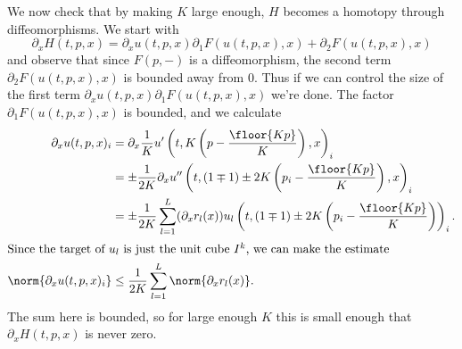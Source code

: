 We now check that by making $K$ large enough, $H$ becomes a homotopy through diffeomorphisms. We start with
$$\partial_x H(t,p,x) = \partial_x u(t,p,x) \partial_1 F(u(t,p,x), x) + \partial_2 F(u(t,p,x), x)$$
and observe that since $F(p, -)$ is a diffeomorphism, the second term $\partial_2 F(u(t,p,x), x)$ is bounded away from $0$. Thus if we can control the
size of the first term $\partial_x u(t,p,x) \partial_1 F(u(t,p,x), x)$ we're done. The factor $\partial_1 F(u(t,p,x), x)$ is bounded, and we
calculate 
\begin{align*}
\partial_x u(t,p,x)_i & = \partial_x \frac{1}{K} u'\left(t, K\left(p - \frac{\floor{K p}}{K}\right), x\right)_i \\
                      & = \pm \frac{1}{2 K} \partial_x u''\left(t, (1\mp1)\pm 2K\left(p_i-\frac{\floor{K p}}{K}\right), x\right)_i \\
                      & = \pm \frac{1}{2 K} \sum_{l=1}^L (\partial_x r_l(x)) u_l\left(t, (1\mp1)\pm 2K\left(p_i-\frac{\floor{K p}}{K}\right)\right)_i. \\
\intertext{Since the target of $u_l$ is just the unit cube $I^k$, we can make the estimate}
\norm{\partial_x u(t,p,x)_i} & \leq \frac{1}{2 K} \sum_{l=1}^L \norm{\partial_x r_l(x)}.
\end{align*}
The sum here is bounded, so for large enough $K$ this is small enough that $\partial_x H(t,p,x)$ is never zero.
